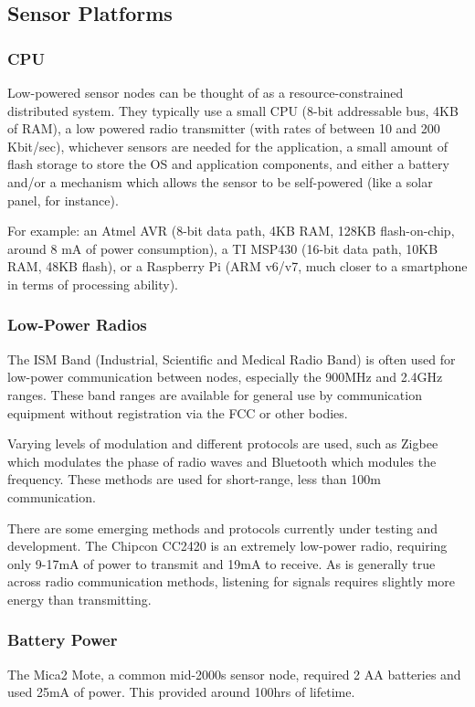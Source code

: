 \documentclass[twoside]{article}
\begin{document}
\subsection{Sensor Platforms}


\subsubsection{CPU}
Low-powered sensor nodes can be thought of as a resource-constrained distributed system. They typically use a small CPU (8-bit addressable bus, 4KB of RAM), a low powered radio transmitter (with rates of between 10 and 200 Kbit/sec), whichever sensors are needed for the application, a small amount of flash storage to store the OS and application components, and either a battery and/or a mechanism which allows the sensor to be self-powered (like a solar panel, for instance).

For example: an Atmel AVR (8-bit data path, 4KB RAM, 128KB flash-on-chip, around 8 mA of power consumption), a TI MSP430 (16-bit data path, 10KB RAM, 48KB flash), or a Raspberry Pi (ARM v6/v7, much closer to a smartphone in terms of processing ability).

\subsubsection{Low-Power Radios}
The ISM Band (Industrial, Scientific and Medical Radio Band) is often used for low-power communication between nodes, especially the 900MHz and 2.4GHz ranges. These band ranges are available for general use by communication equipment without registration via the FCC or other bodies. 

Varying levels of modulation and different protocols are used, such as Zigbee which modulates the phase of radio waves and Bluetooth which modules the frequency. These methods are used for short-range, less than 100m communication.

There are some emerging methods and protocols currently under testing and development. The Chipcon CC2420 is an extremely low-power radio, requiring only 9-17mA of power to transmit and 19mA to receive. As is generally true across radio communication methods, listening for signals requires slightly more energy than transmitting.

\subsubsection{Battery Power}
The Mica2 Mote, a common mid-2000s sensor node, required 2 AA batteries and used 25mA of power. This provided around 100hrs of lifetime.
\end{document}

